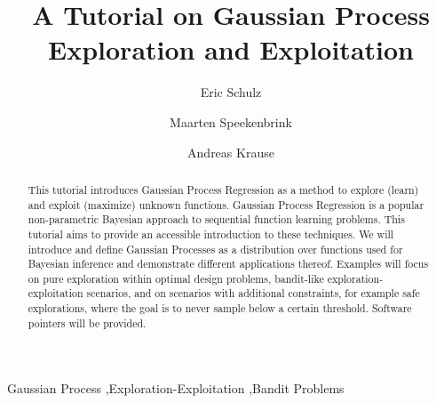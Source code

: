 \documentclass[authoryear,11pt,review]{elsarticle}
\begin{document}
\begin{frontmatter}
\title{A Tutorial on Gaussian Process Exploration and Exploitation}
\author{Eric Schulz}
\author{ Maarten Speekenbrink}
\author{Andreas Krause}
\address{Computational Learning and Decision Making Laboratory \\ University College London}
\address{ Learning and Adaptive Systems Group \\ ETH Z\"urich}

\begin{abstract}
This tutorial introduces Gaussian Process Regression as a method to explore (learn) and exploit (maximize) unknown functions. Gaussian Process Regression is a popular non-parametric Bayesian approach to sequential function learning problems. This tutorial aims to provide an accessible introduction to these techniques. We will introduce and define Gaussian Processes as a distribution over functions used for Bayesian inference and demonstrate different applications thereof. Examples will focus on pure exploration within optimal design problems, bandit-like exploration-exploitation scenarios, and on scenarios with additional constraints, for example safe explorations, where the goal is to never sample below a certain threshold. Software pointers will be provided.
\end{abstract}
\begin{keyword}
Gaussian Process \sep Exploration-Exploitation \sep Bandit Problems
\end{keyword}
\end{frontmatter}
\linenumbers
\newpage

\end{document}
